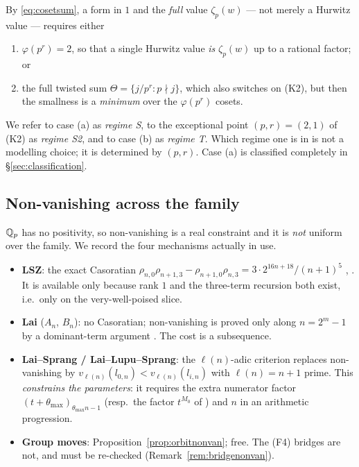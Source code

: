 \begin{proposition}\label{prop:cosets}
\PROVED{} By \eqref{eq:cosetsum}, a form in $1$ and the \emph{full} value $\zeta_p(w)$ ---
not merely a Hurwitz value --- requires either
\begin{enumerate}[label=\textup{(\alph*)},leftmargin=2.6em]
\item $\varphi(p^r)=2$, so that a single Hurwitz value \emph{is} $\zeta_p(w)$ up to a
      rational factor; or
\item the full twisted sum $\Theta=\{j/p^r:p\nmid j\}$, which also switches on (K2), but
      then the smallness is a \emph{minimum} over the $\varphi(p^r)$ cosets.
\end{enumerate}
\end{proposition}

We refer to case (a) as \emph{regime S}, to the exceptional point $(p,r)=(2,1)$ of (K2) as
\emph{regime S2}, and to case (b) as \emph{regime T}. Which regime one is in is not a
modelling choice; it is determined by $(p,r)$. Case (a) is classified completely in
\S\ref{sec:classification}.

\subsection{Non-vanishing across the family}\label{ss:nonvanfam}

$\mathbb{Q}_p$ has no positivity, so non-vanishing is a real constraint and it is \emph{not} uniform
over the family. We record the four mechanisms actually in use.

\begin{itemize}[leftmargin=1.6em,itemsep=3pt]
\item \textbf{LSZ}: the exact Casoratian
      $\rho_{n,0}\rho_{n+1,3}-\rho_{n+1,0}\rho_{n,3}=3\cdot2^{16n+18}/(n+1)^5$
      \cite[Lemma 15(b)]{LSZ2025}, . It is available only because rank
      $1$ and the three-term recursion both exist, i.e.\ only on the very-well-poised slice.
\item \textbf{Lai} ($A_n$, $B_n$): no Casoratian; non-vanishing is proved only along
      $n=2^m-1$ by a dominant-term argument \cite[Lemmas 2.4, 2.5, 6.1]{Lai2025}. The cost is
      a subsequence.
\item \textbf{Lai--Sprang / Lai--Lupu--Sprang}: the $\ell(n)$-adic criterion
      \cite[Lemma 4]{LaiSprang2023} replaces non-vanishing by
      $v_{\ell(n)}(l_{0,n})<v_{\ell(n)}(l_{i,n})$ with $\ell(n)=n+1$ prime. This
      \emph{constrains the parameters}: it requires the extra numerator factor
      $(t+\theta_{\max})_{\theta_{\max}n-1}$ (resp.\ the factor $t^{M_0}$ of
      \cite{LLS2025}) and $n$ in an arithmetic progression.
\item \textbf{Group moves}: Proposition~\ref{prop:orbitnonvan}; free. The (F4) bridges are
      not, and must be re-checked (Remark~\ref{rem:bridgenonvan}).
\end{itemize}

